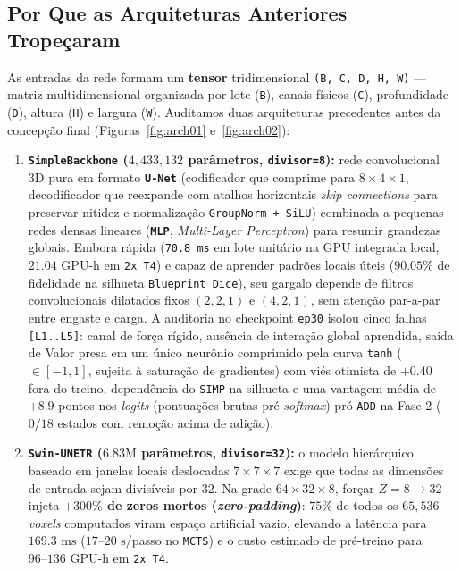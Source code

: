 \documentclass[11pt,a4paper]{article}
\begin{document}
\subsection{Por Que as Arquiteturas Anteriores Tropeçaram}

As entradas da rede formam um \textbf{tensor} tridimensional \texttt{(B, C, D, H, W)} — matriz multidimensional organizada por lote (\texttt{B}), canais físicos (\texttt{C}), profundidade (\texttt{D}), altura (\texttt{H}) e largura (\texttt{W}). Auditamos duas arquiteturas precedentes antes da concepção final (Figuras~\ref{fig:arch01} e~\ref{fig:arch02}):

\begin{enumerate}
\item \textbf{\texttt{SimpleBackbone} ($4{,}433{,}132$ parâmetros, \texttt{divisor=8}):} rede convolucional 3D pura em formato \textbf{\texttt{U-Net}} (codificador que comprime para $8\times 4\times 1$, decodificador que reexpande com atalhos horizontais \emph{skip connections} para preservar nitidez e normalização \texttt{GroupNorm + SiLU}) combinada a pequenas redes densas lineares (\textbf{\texttt{MLP}}, \emph{Multi-Layer Perceptron}) para resumir grandezas globais. Embora rápida (\texttt{70.8 ms} em lote unitário na GPU integrada local, $21.04\text{ GPU-h}$ em \texttt{2x T4}) e capaz de aprender padrões locais úteis ($90.05\%$ de fidelidade na silhueta \texttt{Blueprint Dice}), seu gargalo depende de filtros convolucionais dilatados fixos $(2,2,1)$ e $(4,2,1)$, sem atenção par-a-par entre engaste e carga. A auditoria no checkpoint \texttt{ep30} isolou cinco falhas \texttt{[L1..L5]}: canal de força rígido, ausência de interação global aprendida, saída de Valor presa em um único neurônio comprimido pela curva \texttt{tanh} ($\in [-1, 1]$, sujeita à saturação de gradientes) com viés otimista de $+0.40$ fora do treino, dependência do \texttt{SIMP} na silhueta e uma vantagem média de $+8.9$ pontos nos \emph{logits} (pontuações brutas pré-\emph{softmax}) pró-\texttt{ADD} na Fase 2 ($0/18$ estados com remoção acima de adição).
\item \textbf{\texttt{Swin-UNETR} ($6.83\text{M}$ parâmetros, \texttt{divisor=32}):} o modelo hierárquico baseado em janelas locais deslocadas $7\times 7\times 7$ \citep{liu2021swin,hatamizadeh2022swin} exige que todas as dimensões de entrada sejam divisíveis por $32$. Na grade $64\times 32\times 8$, forçar $Z=8 \to 32$ injeta \textbf{$+300\%$ de zeros mortos (\emph{zero-padding})}: $75\%$ de todos os $65{,}536$ \emph{voxels} computados viram espaço artificial vazio, elevando a latência para $169.3\text{ ms}$ ($17\text{--}20\text{ s}$/passo no \texttt{MCTS}) e o custo estimado de pré-treino para $96\text{--}136\text{ GPU-h}$ em \texttt{2x T4}.
\end{enumerate}
\end{document}
